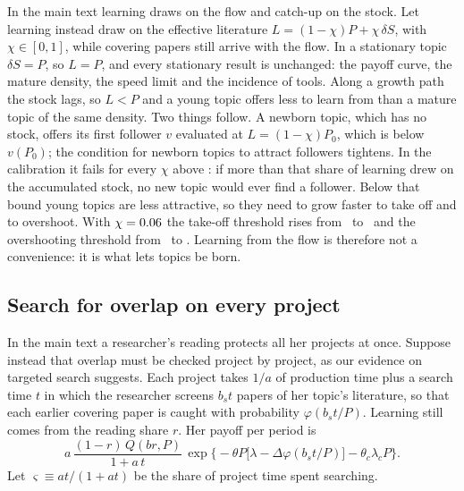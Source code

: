 In the main text learning draws on the flow and catch-up on the stock. Let
learning instead draw on the effective literature
$L=(1-\chi)P+\chi\,\delta S$, with $\chi\in[0,1]$, while covering papers still
arrive with the flow. In a stationary topic $\delta S=P$, so $L=P$, and every
stationary result is unchanged: the payoff curve, the mature density, the
speed limit and the incidence of tools. Along a growth path the stock lags, so
$L<P$ and a young topic offers less to learn from than a mature topic of the
same density. Two things follow. A newborn topic, which has no stock, offers
its first follower $v$ evaluated at $L=(1-\chi)P_0$, which is below $v(P_0)$; the
condition for newborn topics to attract followers tightens. In the
calibration it fails for every $\chi$ above \calChiBar: if more than that share
of learning drew on the accumulated stock, no new topic would ever find a
follower. Below that bound young topics are less attractive, so they need to
grow faster to take off and to overshoot. With $\chi=0.06$ the take-off
threshold rises from \calGtakeoff\ to \calGtakeoffChiHalf\ and the overshooting
threshold from \calGstarExact\ to \calGstarChiHalf. Learning from the flow is
therefore not a convenience: it is what lets topics be born.

\subsection{Search for overlap on every project}\label{app:perproject}

In the main text a researcher's reading protects all her projects at once.
Suppose instead that overlap must be checked project by project, as our
evidence on targeted search suggests. Each project takes $1/a$ of production
time plus a search time $t$ in which the researcher screens $b_st$ papers of her
topic's literature, so that each earlier covering paper is caught with
probability $\varphi(b_st/P)$. Learning still comes from the reading share $r$.
Her payoff per period is
\[
a\,\frac{(1-r)\,Q(br,P)}{1+a\,t}\,\exp\Big\{-\theta P\big[\lambda-\Delta\varphi(b_st/P)\big]-\theta_c\lambda_cP\Big\}.
\]
Let $\varsigma\equiv at/(1+at)$ be the share of project time spent searching.


